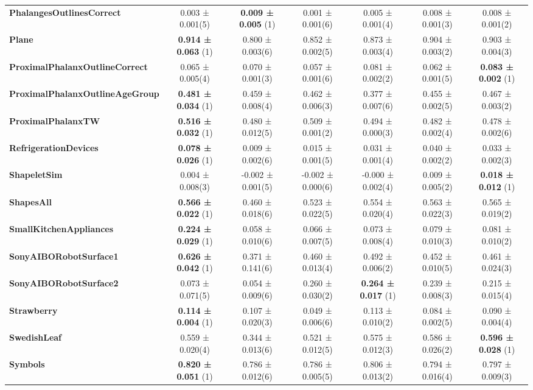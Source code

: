\begin{table}[ht]
\begin{adjustbox}{width=\textwidth}
\begin{tabular}{lcccccc}
    \textbf{PhalangesOutlinesCorrect} & 0.003 ± 0.001(5) & \textbf{0.009 ± 0.005} (1) & 0.001 ± 0.001(6) & 0.005 ± 0.001(4) & 0.008 ± 0.001(3) & 0.008 ± 0.001(2) \\
    \textbf{Plane} & \textbf{0.914 ± 0.063} (1) & 0.800 ± 0.003(6) & 0.852 ± 0.002(5) & 0.873 ± 0.003(4) & 0.904 ± 0.003(2) & 0.903 ± 0.004(3) \\
    \textbf{ProximalPhalanxOutlineCorrect} & 0.065 ± 0.005(4) & 0.070 ± 0.001(3) & 0.057 ± 0.001(6) & 0.081 ± 0.002(2) & 0.062 ± 0.001(5) & \textbf{0.083 ± 0.002} (1) \\
    \textbf{ProximalPhalanxOutlineAgeGroup} & \textbf{0.481 ± 0.034} (1) & 0.459 ± 0.008(4) & 0.462 ± 0.006(3) & 0.377 ± 0.007(6) & 0.455 ± 0.002(5) & 0.467 ± 0.003(2) \\
    \textbf{ProximalPhalanxTW} & \textbf{0.516 ± 0.032} (1) & 0.480 ± 0.012(5) & 0.509 ± 0.001(2) & 0.494 ± 0.000(3) & 0.482 ± 0.002(4) & 0.478 ± 0.002(6) \\
    \textbf{RefrigerationDevices} & \textbf{0.078 ± 0.026} (1) & 0.009 ± 0.002(6) & 0.015 ± 0.001(5) & 0.031 ± 0.001(4) & 0.040 ± 0.002(2) & 0.033 ± 0.002(3) \\
    \textbf{ShapeletSim} & 0.004 ± 0.008(3) & -0.002 ± 0.001(5) & -0.002 ± 0.000(6) & -0.000 ± 0.002(4) & 0.009 ± 0.005(2) & \textbf{0.018 ± 0.012} (1) \\
    \textbf{ShapesAll} & \textbf{0.566 ± 0.022} (1) & 0.460 ± 0.018(6) & 0.523 ± 0.022(5) & 0.554 ± 0.020(4) & 0.563 ± 0.022(3) & 0.565 ± 0.019(2) \\
    \textbf{SmallKitchenAppliances} & \textbf{0.224 ± 0.029} (1) & 0.058 ± 0.010(6) & 0.066 ± 0.007(5) & 0.073 ± 0.008(4) & 0.079 ± 0.010(3) & 0.081 ± 0.010(2) \\
    \textbf{SonyAIBORobotSurface1} & \textbf{0.626 ± 0.042} (1) & 0.371 ± 0.141(6) & 0.460 ± 0.013(4) & 0.492 ± 0.006(2) & 0.452 ± 0.010(5) & 0.461 ± 0.024(3) \\
    \textbf{SonyAIBORobotSurface2} & 0.073 ± 0.071(5) & 0.054 ± 0.009(6) & 0.260 ± 0.030(2) & \textbf{0.264 ± 0.017} (1) & 0.239 ± 0.008(3) & 0.215 ± 0.015(4) \\
    \textbf{Strawberry} & \textbf{0.114 ± 0.004} (1) & 0.107 ± 0.020(3) & 0.049 ± 0.006(6) & 0.113 ± 0.010(2) & 0.084 ± 0.002(5) & 0.090 ± 0.004(4) \\
    \textbf{SwedishLeaf} & 0.559 ± 0.020(4) & 0.344 ± 0.013(6) & 0.521 ± 0.012(5) & 0.575 ± 0.012(3) & 0.586 ± 0.026(2) & \textbf{0.596 ± 0.028} (1) \\
    \textbf{Symbols} & \textbf{0.820 ± 0.051} (1) & 0.786 ± 0.012(6) & 0.786 ± 0.005(5) & 0.806 ± 0.013(2) & 0.794 ± 0.016(4) & 0.797 ± 0.009(3) \\

\end{tabular}
\end{adjustbox}
\end{table}
